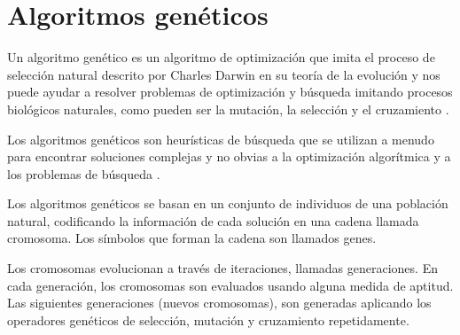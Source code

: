 \section {Algoritmos genéticos}

Un algoritmo genético es un algoritmo de optimización que imita el proceso de selección natural descrito por Charles Darwin en su teoría de la evolución y nos puede ayudar a resolver problemas de optimización y búsqueda imitando procesos biológicos naturales, como pueden ser la mutación, la selección y el cruzamiento \cite{batista_algoritmos_2009}.

\bigskip
Los algoritmos genéticos son heurísticas de búsqueda que se utilizan a menudo para encontrar soluciones complejas y no obvias a la optimización algorítmica y a los problemas de búsqueda \cite{orcero_inteligencia_2002}.

\bigskip
Los algoritmos genéticos se basan en un conjunto de individuos de una población natural, codificando la información de cada solución en una cadena llamada cromosoma. Los símbolos que forman la cadena son llamados genes.

\bigskip
Los cromosomas evolucionan a través de iteraciones, llamadas generaciones. En cada generación, los cromosomas son evaluados usando alguna medida de aptitud. Las siguientes generaciones (nuevos cromosomas), son generadas aplicando los operadores genéticos de selección, mutación y cruzamiento repetidamente.


